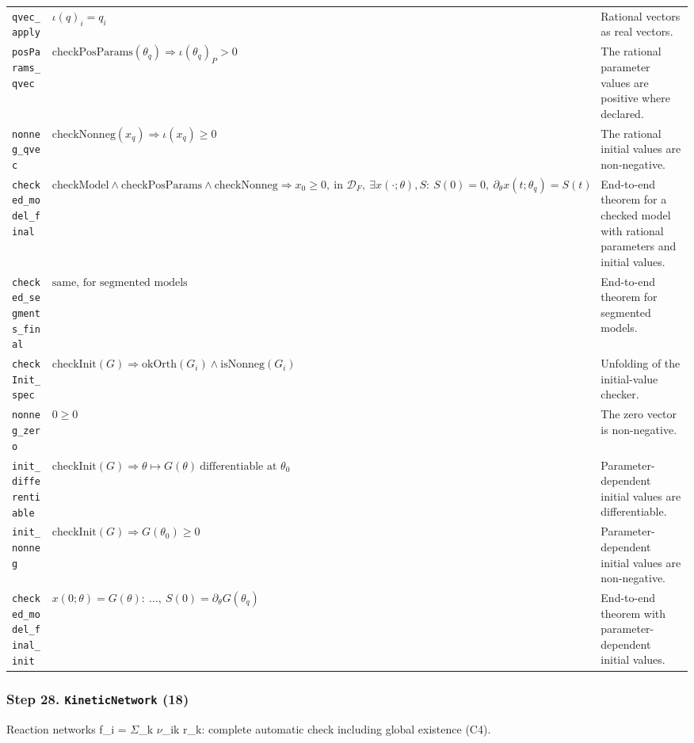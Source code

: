 {\begin{longtable}{@{}>{\raggedright\arraybackslash}p{3.6cm}>{\raggedright\arraybackslash}p{6.6cm}>{\raggedright\arraybackslash}p{5.6cm}@{}}
\texttt{qvec\_\allowbreak{}apply} & $\displaystyle \iota(q)_i=q_i$ & Rational vectors as real vectors. \\[3pt]
\texttt{posParams\_\allowbreak{}qvec} & $\displaystyle \mathrm{checkPosParams}(\theta_q)\Rightarrow\iota(\theta_q)_P>0$ & The rational parameter values are positive where declared. \\[3pt]
\texttt{nonneg\_\allowbreak{}qvec} & $\displaystyle \mathrm{checkNonneg}(x_q)\Rightarrow\iota(x_q)\ge0$ & The rational initial values are non-negative. \\[3pt]
\texttt{checked\_\allowbreak{}model\_\allowbreak{}final} & $\displaystyle \mathrm{checkModel}\wedge\mathrm{checkPosParams}\wedge\mathrm{checkNonneg}\Rightarrow x_0\ge0,\ \text{in }\mathcal D_F,\ \exists x(\cdot;\theta),S:\ S(0)=0,\ \partial_\theta x(t;\theta_q)=S(t)$ & End-to-end theorem for a checked model with rational parameters and initial values. \\[3pt]
\texttt{checked\_\allowbreak{}segments\_\allowbreak{}final} & $\displaystyle \text{same, for segmented models}$ & End-to-end theorem for segmented models. \\[3pt]
\texttt{checkInit\_\allowbreak{}spec} & $\displaystyle \mathrm{checkInit}(G)\Rightarrow\mathrm{okOrth}(G_i)\wedge\mathrm{isNonneg}(G_i)$ & Unfolding of the initial-value checker. \\[3pt]
\texttt{nonneg\_\allowbreak{}zero} & $\displaystyle 0\ge0$ & The zero vector is non-negative. \\[3pt]
\texttt{init\_\allowbreak{}differentiable} & $\displaystyle \mathrm{checkInit}(G)\Rightarrow\theta\mapsto G(\theta)\ \text{differentiable at }\theta_0$ & Parameter-dependent initial values are differentiable. \\[3pt]
\texttt{init\_\allowbreak{}nonneg} & $\displaystyle \mathrm{checkInit}(G)\Rightarrow G(\theta_0)\ge0$ & Parameter-dependent initial values are non-negative. \\[3pt]
\texttt{checked\_\allowbreak{}model\_\allowbreak{}final\_\allowbreak{}init} & $\displaystyle x(0;\theta)=G(\theta):\ \dots,\ S(0)=\partial_\theta G(\theta_q)$ & End-to-end theorem with parameter-dependent initial values. \\[3pt]
\bottomrule
\end{longtable}
}

\subsubsection*{Step 28. \texttt{KineticNetwork} (18)}
Reaction networks f\_i = $\Sigma$\_k $\nu$\_ik r\_k: complete automatic check including global existence (C4).

